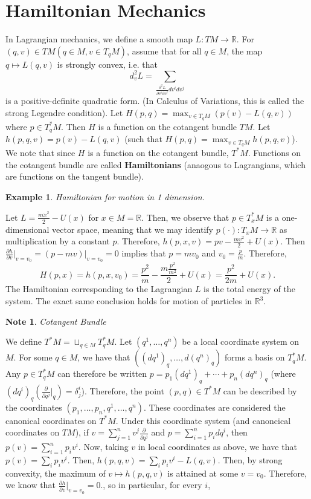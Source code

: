 \documentclass{article}
\newcommand{\R}{\mathbb R}
\newcommand{\nl}{\newline\newline\noindent}
\newcommand{\pd}[1]{\frac{\partial}{\partial #1}}
\newcommand{\pdof}[2]{\frac{\partial #1}{\partial #2}}
\newtheorem{ex}{Example}
\newtheorem{note}{Note}
\begin{document}
\section{Hamiltonian Mechanics}
In Lagrangian mechanics, we define a smooth map $L:TM \to \R$. For $(q,v)\in TM (q\in M, v\in T_qM)$, assume that for all $q\in M$, the map
$q\mapsto L(q,v)$ is strongly convex, i.e. that 
\[d^2_vL = \sum_{\frac{\partial^2L}{\partial v^i\partial v^j}dv^idv^j}\]
is a positive-definite quadratic form. (In Calculus of Variations, this is called the strong Legendre condition).
\nl
Let $H(p,q)= \max_{v\in T_qM}(p(v)-L(q,v))$ where $p\in T_q^*M$. Then $H$ is a function on the cotangent bundle $TM$. Let $h(p,q,v) = p(v)-L(q,v)$ (such that $H(p,q) = \max_{v\in T_qM} h(p,q,v)$). We note that since $H$ is a function on the cotangent bundle, $T^*M$. Functions on the cotangent bundle are called \textbf{Hamiltonians} (anaogous to Lagrangians, which are functions on the tangent bundle).
\begin{ex}
    Hamiltonian for motion in 1 dimension.
\end{ex}
Let $L = \frac{m\dot x^2}{2} - U(x)$ for $x\in M=\R$. Then, we observe that $p\in T^*_xM$ is a one-dimensional vector space, meaning that we may identify $p(\cdot):T_xM\to \R$ as multiplication by a constant $p$. Therefore, $h(p,x,v) = pv-\frac{mv^2}{2}+U(x)$. Then $\pdof{h}{v}\big|_{v=v_0} = (p-mv)|_{v=v_0} = 0$ implies that $p = mv_0$ and $v_0 = \frac{p}{m}$. Therefore,
\[H(p,x) = h(p,x,v_0) = \frac{p^2}{m} - \frac{m\frac{p^2}{m^2}}{2}+U(x) = \frac{p^2}{2m}+U(x).\]
The Hamiltonian corresponding to the Lagrangian $L$ is the total energy of the system. The exact same conclusion holds for motion of particles in $\R^3$.
\nl
\begin{note}
    Cotangent Bundle
\end{note}
We define $T^*M = \sqcup_{q\in M}T_q^*M$. Let $(q^1,\dots, q^n)$ be a local coordinate system on $M$. For some $q\in M$, we have that $\left((dq^1)_q,\dots,d(q^n)_q\right)$ forms a basis on $T_q^*M$. Any $p\in T_q^*M$ can therefore be written $p = p_1(dq^1)_q + \cdots + p_n (dq^n)_q$ (where $(dq^i)_q\left(\pd{q^j}|_{q}\right) = \delta^i_j$). Therefore, the point $(p,q)\in T^*M$ can be described by the coordinates $(p_1,\dots,p_n,q^1,\dots,q^n)$. These coordinates are considered the canonical coordinates on $T^*M$. Under this coordinate system (and canoncical coordinates on $TM$), if $v = \sum_{j=1}^n v^j\pd{q^j}$ and $p = \sum_{i=1}^n p_idq^i$, then $p(v) = \sum_{i=1}^n p_iv^i$.
\nl
Now, taking $v$ in local coordinates as above, we have that $p(v) = \sum_i p_iv^i$. Then, $h(p,q,v) = \sum_i p_iv^i - L(q,v)$. Then, by strong convexity, the maximum of $v\mapsto h(p,q, v)$ is attained at some $v=v_0$. Therefore, we know that $\pdof{h}{v}\big|_{v=v_0} = 0$., so in particular, for every $i$,
\end{document}
